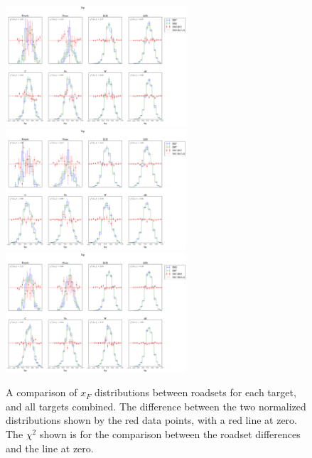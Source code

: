 \begin{figure}
	\centering
	\includegraphics[width=0.6\textwidth]{figures/analysis/R57_R62_compare_xF.png}\vspace{5pt} \\
	\includegraphics[width=0.6\textwidth]{figures/analysis/R57_R67_compare_xF.png} \vspace{5pt} \\
	\includegraphics[width=0.6\textwidth]{figures/analysis/R62_R67_compare_xF.png}
	\caption{A comparison of $x_F$ distributions between roadsets for each target, and all targets combined. The difference between the two normalized distributions shown by the red data points, with a red line at zero. The $\chi^2$ shown is for the comparison between the roadset differences and the line at zero.}
	\label{fig:roadset-xF-compare}
\end{figure}